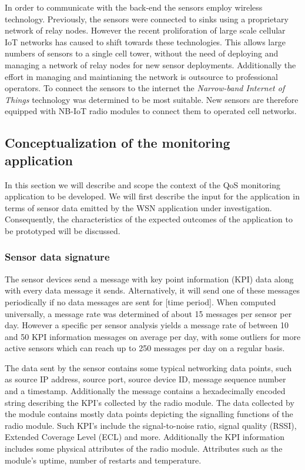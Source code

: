 In order to communicate with the back-end the sensors employ wireless technology. Previously, the sensors were connected to sinks using a proprietary network of relay nodes. However the recent proliforation of large scale cellular IoT networks has caused \nedap to shift towards these technologies. This allows large numbers of sensors to a single cell tower, without the need of deploying and managing a network of relay nodes for new sensor deployments. Additionally the effort in managing and maintianing the network is outsource to professional operators. To connect the sensors to the internet the \emph{Narrow-band Internet of Things} technology was determined to be most suitable. New \sensit sensors are therefore equipped with \ublox \cite{web:ublox} NB-IoT radio modules to connect them to operated cell networks.

\subsection{Conceptualization of the monitoring application}
In this section we will describe and scope the context of the QoS monitoring application to be developed. We will first describe the input for the application in terms of sensor data emitted by the WSN application under investigation. Consequently, the characteristics of the expected outcomes of the application to be prototyped will be discussed. 

\subsubsection{Sensor data signature}
The sensor devices send a message with key point information (KPI) data along with every data message it sends. Alternatively, it will send one of these messages periodically if no data messages are sent for [time period]. When computed universally, a message rate was determined of about 15 messages per sensor per day. However a specific per sensor analysis yields a message rate of between 10 and 50 KPI information messages on average per day, with some outliers for more active sensors which can reach up to 250 messages per day on a regular basis.

The data sent by the sensor contains some typical networking data points, such as source IP address, source port, source device ID, message sequence number and a timestamp. Additionally the message contains a hexadecimally encoded string describing the KPI's collected by the \ublox radio module. The data collected by the \ublox module contains mostly data points depicting the signalling functions of the radio module. Such KPI's include the signal-to-noise ratio, signal quality (RSSI), Extended Coverage Level (ECL)  and more. Additionally the KPI information includes some physical attributes of the radio module. Attributes such as the module's uptime, number of restarts and temperature. 

